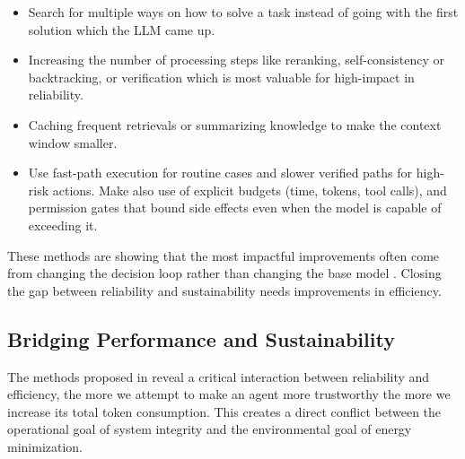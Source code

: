 \documentclass[10pt,twocolumn,letterpaper]{article}
\begin{document}
\begin{itemize}
    \item Search for multiple ways on how to solve a task instead of going with the first solution which the LLM came up.
    \item Increasing the number of processing steps like reranking, self-consistency or backtracking, or verification which is most valuable for high-impact in reliability.
    \item Caching frequent retrievals or summarizing knowledge to make the context window smaller.
    \item Use fast-path execution for routine cases and slower verified paths for high-risk actions. Make also use of explicit budgets (time, tokens, tool calls), and permission gates that bound side effects even when the model is capable of exceeding it.
\end{itemize}

These methods are showing that the most impactful improvements often come from changing the decision loop rather than changing the base model \citep{Xu_2026}. Closing the gap between reliability and sustainability needs improvements in efficiency.

\subsection{Bridging Performance and Sustainability}
The methods proposed in \citep{Xu_2026} reveal a critical interaction between reliability and efficiency, the more we attempt to make an agent more trustworthy the more we increase its total token consumption. This creates a direct conflict between the operational goal of system integrity and the environmental goal of energy minimization. 
\end{document}
